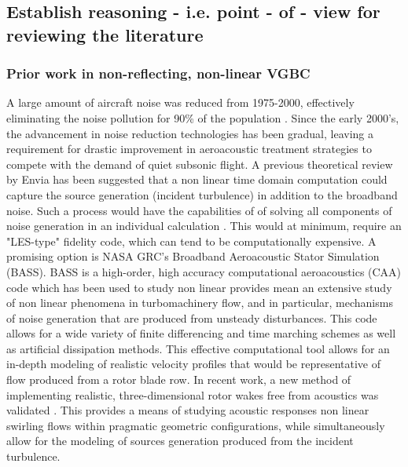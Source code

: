 \documentclass[conf]{new-aiaa}
\begin{document}
\subsection{Establish reasoning - i.e. point - of - view for reviewing the literature}
\subsubsection{Prior work in non-reflecting, non-linear VGBC}
 A large amount of aircraft noise was reduced from 1975-2000, effectively eliminating the noise pollution for 90\% of the population \cite{Administration}. Since the early 2000's, the advancement in noise reduction technologies has been gradual, leaving a requirement for drastic improvement in aeroacoustic treatment strategies to compete with the demand of quiet subsonic  flight. A previous theoretical review by Envia has been suggested that a non linear time domain computation could capture the source generation (incident turbulence) in addition to the broadband noise. Such a process would have the capabilities of  of solving all components of noise generation in an individual calculation \cite{Envia2004}. This would at minimum, require an "LES-type" fidelity code, which can tend to be computationally expensive. 
 A promising option is NASA GRC's Broadband Aeroacoustic Stator Simulation (BASS). BASS is a high-order, high accuracy computational aeroacoustics (CAA) code which has been used to study non linear provides mean an extensive study of non linear phenomena in turbomachinery flow, and in particular, mechanisms of noise generation that are produced from unsteady disturbances. This code allows for a wide variety of finite differencing and time marching schemes as well as artificial dissipation methods. This effective computational tool allows for an in-depth modeling of realistic velocity profiles that would be representative of flow produced from a rotor blade row. In recent work, a new method of implementing realistic, three-dimensional rotor wakes free from acoustics was validated  \cite{Hixon2011}. This provides a means of studying acoustic responses non linear swirling flows within pragmatic geometric configurations, while simultaneously allow for the modeling of sources generation produced from the incident turbulence. 
\end{document}
